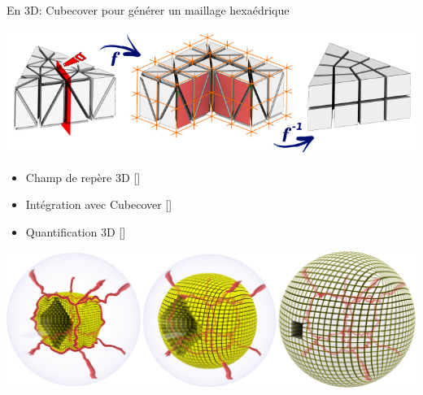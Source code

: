 \begin{frame}{En 3D: Cubecover pour générer un maillage hexaédrique}
    \begin{center}
		\includegraphics[width=.5\linewidth]{img/introduction/param_globale.PNG}
		\begin{itemize}
			\item Champ de repère 3D [\cite{huang_boundary_2011, ray_practical_2016}]
			\item Intégration avec Cubecover [\cite{nieser_cubecover_2011}]
			\item Quantification 3D [\cite{bruckler_volume_2022}]
		\end{itemize}
        \includegraphics[width=.8\linewidth]{img/cubecover/B34_graphe_interieur.PNG}
    \end{center}
\end{frame}
